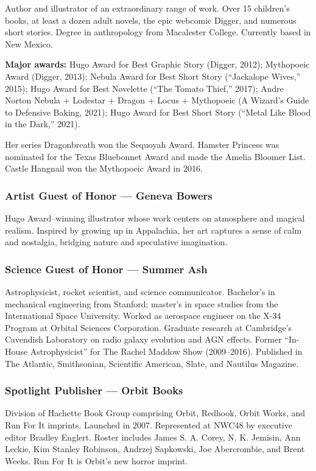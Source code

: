 \documentclass[11pt,letterpaper]{article}
\begin{document}
Author and illustrator of an extraordinary range of work. Over 15 children's books, at least a dozen adult novels, the epic webcomic Digger, and numerous short stories. Degree in anthropology from Macalester College. Currently based in New Mexico.

\textbf{Major awards:} Hugo Award for Best Graphic Story (Digger, 2012); Mythopoeic Award (Digger, 2013); Nebula Award for Best Short Story (``Jackalope Wives,'' 2015); Hugo Award for Best Novelette (``The Tomato Thief,'' 2017); Andre Norton Nebula + Lodestar + Dragon + Locus + Mythopoeic (A Wizard's Guide to Defensive Baking, 2021); Hugo Award for Best Short Story (``Metal Like Blood in the Dark,'' 2021).

Her series Dragonbreath won the Sequoyah Award. Hamster Princess was nominated for the Texas Bluebonnet Award and made the Amelia Bloomer List. Castle Hangnail won the Mythopoeic Award in 2016.

\subsubsection{Artist Guest of Honor --- Geneva Bowers}

Hugo Award--winning illustrator whose work centers on atmosphere and magical realism. Inspired by growing up in Appalachia, her art captures a sense of calm and nostalgia, bridging nature and speculative imagination.

\subsubsection{Science Guest of Honor --- Summer Ash}

Astrophysicist, rocket scientist, and science communicator. Bachelor's in mechanical engineering from Stanford; master's in space studies from the International Space University. Worked as aerospace engineer on the X-34 Program at Orbital Sciences Corporation. Graduate research at Cambridge's Cavendish Laboratory on radio galaxy evolution and AGN effects. Former ``In-House Astrophysicist'' for The Rachel Maddow Show (2009--2016). Published in The Atlantic, Smithsonian, Scientific American, Slate, and Nautilus Magazine.

\subsubsection{Spotlight Publisher --- Orbit Books}

Division of Hachette Book Group comprising Orbit, Redhook, Orbit Works, and Run For It imprints. Launched in 2007. Represented at NWC48 by executive editor Bradley Englert. Roster includes James S. A. Corey, N. K. Jemisin, Ann Leckie, Kim Stanley Robinson, Andrzej Sapkowski, Joe Abercrombie, and Brent Weeks. Run For It is Orbit's new horror imprint.
\end{document}
